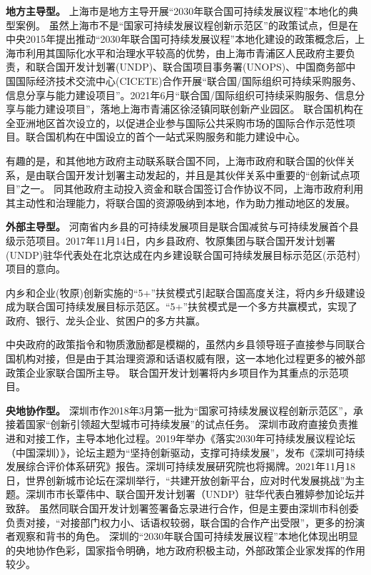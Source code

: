 \documentclass[
  12pt,
]{ctexart}
\begin{document}
\textbf{地方主导型。}
上海市是地方主导开展``2030年联合国可持续发展议程''本地化的典型案例。
虽然上海市不是``国家可持续发展议程创新示范区''的政策试点，但是在中央2015年提出推动``2030年联合国可持续发展议程''本地化建设的政策概念后，上海市利用其国际化水平和治理水平较高的优势，由上海市青浦区人民政府主要负责，和联合国开发计划署(UNDP)、联合国项目事务署(UNOPS)、中国商务部中国国际经济技术交流中心(CICETE)合作开展``联合国/国际组织可持续采购服务、信息分享与能力建设项目''。2021年6月``联合国/国际组织可持续采购服务、信息分享与能力建设项目''，落地上海市青浦区徐泾镇同联创新产业园区。
联合国机构在全亚洲地区首次设立的，以促进企业参与国际公共采购市场的国际合作示范性项目。联合国机构在中国设立的首个一站式采购服务和能力建设中心。

有趣的是，和其他地方政府主动联系联合国不同，上海市政府和联合国的伙伴关系，是由联合国开发计划署主动发起的，并且是其伙伴关系中重要的``创新试点项目''之一。
同其他政府主动投入资金和联合国签订合作协议不同，上海市政府利用其主动性和治理能力，将联合国的资源吸纳到本地，作为助力推动地区的发展。

\textbf{外部主导型。}
河南省内乡县的可持续发展项目是联合国减贫与可持续发展首个县级示范项目。2017年11月14日，内乡县政府、牧原集团与联合国开发计划署(UNDP)驻华代表处在北京达成在内乡建设联合国可持续发展目标示范区(示范村)项目的意向。

内乡和企业(牧原)创新实施的``5+''扶贫模式引起联合国高度关注，将内乡升级建设成为联合国可持续发展目标示范区。``5+''扶贫模式是一个多方共赢模式，实现了政府、银行、龙头企业、贫困户的多方共赢。

中央政府的政策指令和物质激励都是模糊的，虽然内乡县领导班子直接参与同联合国机构对接，但是由于其治理资源和话语权威有限，这一本地化过程更多的被外部政策企业家联合国所主导。
联合国开发计划署将内乡项目作为其重点的示范项目。

\textbf{央地协作型。}
深圳市作2018年3月第一批为``国家可持续发展议程创新示范区''，承接着国家``创新引领超大型城市可持续发展''的试点任务。
深圳市政府直接负责推进和对接工作，主导本地化过程。2019年举办《落实2030年可持续发展议程论坛（中国深圳）》，论坛主题为``坚持创新驱动，支撑可持续发展''，发布《深圳可持续发展综合评价体系研究》报告。深圳可持续发展研究院也将揭牌。2021年11月18日，世界创新城市论坛在深圳举行，``共建开放创新平台，应对时代发展挑战''为主题。深圳市市长覃伟中、联合国开发计划署（UNDP）驻华代表白雅婷参加论坛并致辞。
虽然同联合国开发计划署签署备忘录进行合作，但是主要由深圳市科创委负责对接，``对接部门权力小、话语权较弱，联合国的合作产出受限''，更多的扮演者观察和背书的角色。
深圳的``2030年联合国可持续发展议程''本地化体现出明显的央地协作色彩，国家指令明确，地方政府积极主动，外部政策企业家发挥的作用较少。
\end{document}
